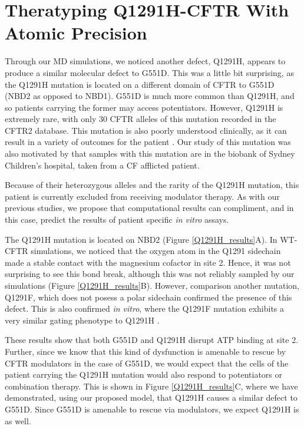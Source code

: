 \section{Theratyping Q1291H-CFTR With Atomic Precision}

Through our MD simulations, we noticed another defect, Q1291H, appears to produce a similar molecular defect to G551D. This was a little bit surprising, as the Q1291H mutation is located on a different domain of CFTR to G551D (NBD2 as opposed to NBD1). G551D is much more common than Q1291H, and so patients carrying the former may access potentiators. However, Q1291H is extremely rare, with only 30 CFTR alleles of this mutation recorded in the CFTR2 database. This mutation is also poorly understood clinically, as it can result in a variety of outcomes for the patient \cite{cftr2}. Our study of this mutation was also motivated by that samples with this mutation are in the biobank of Sydney Children's hospital, taken from a CF afflicted patient. 

Because of their heterozygous alleles and the rarity of the Q1291H mutation, this patient is currently excluded from receiving modulator therapy. As with our previous studies, we propose that computational results can compliment, and in this case, predict the results of patient specific \textit{in vitro} assays. 

The Q1291H mutation is located on NBD2 (Figure \ref{Q1291H_results}A). In WT-CFTR simulations, we noticed that the oxygen atom in the  Q1291 sidechain made a stable contact with the magnesium cofactor in site 2. Hence, it was not surprising to see this bond break, although this was not reliably sampled by our simulations (Figure \ref{Q1291H_results}B). However, comparison another mutation, Q1291F, which does not posess a polar sidechain confirmed the presence of this defect. This is also confirmed \textit{in vitro}, where the Q1291F mutation exhibits a very similar gating phenotype to Q1291H \cite{dong2015}. 

These results show that both G551D and Q1291H disrupt ATP binding at site 2. Further, since we know that this kind of dysfunction is amenable to rescue by CFTR modulators in the case of G551D, we would expect that the cells of the patient carrying the Q1291H mutation would also respond to potentiators or combination therapy. This is shown in Figure \ref{Q1291H_results}C, where we have demonstrated, using our proposed model, that Q1291H causes a similar defect to G551D. Since G551D is amenable to rescue via modulators, we expect Q1291H is as well. 

